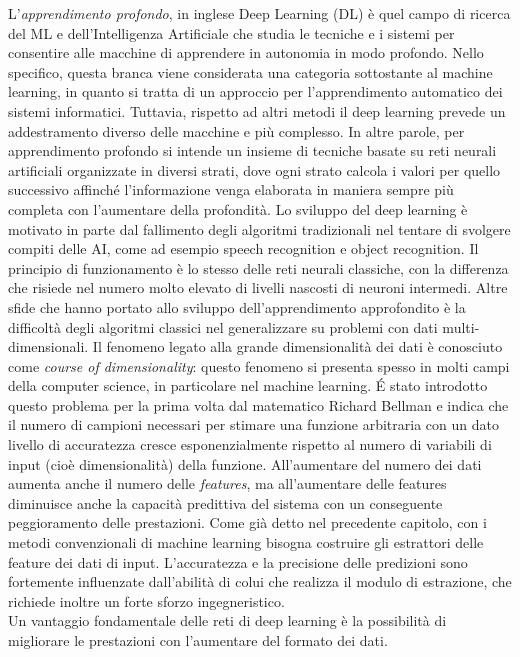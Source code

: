 L'\emph{apprendimento profondo}, in inglese Deep Learning (DL) è quel campo di ricerca del ML 
e dell'Intelligenza Artificiale che studia le tecniche e i sistemi per consentire alle macchine 
di apprendere in autonomia in modo profondo. Nello specifico, questa branca viene considerata una
 categoria sottostante al machine learning, in quanto si tratta di un approccio per l’apprendimento
  automatico dei sistemi informatici. Tuttavia, rispetto ad altri metodi il deep learning prevede 
  un addestramento diverso delle macchine e più complesso. In altre parole, per apprendimento profondo
   si intende un insieme
   di tecniche basate su reti neurali artificiali organizzate in diversi strati, dove ogni strato calcola
    i valori per quello successivo affinché l'informazione venga elaborata in maniera sempre più completa
     con l’aumentare della profondità. Lo sviluppo del deep learning è motivato in parte dal fallimento
      degli algoritmi
      tradizionali nel tentare di svolgere compiti delle AI, come ad esempio speech recognition e object recognition. 
      Il principio di funzionamento è lo stesso delle reti neurali classiche, con la differenza
       che risiede nel numero molto elevato di livelli nascosti di neuroni intermedi.
       Altre sfide che hanno portato allo sviluppo dell’apprendimento approfondito è la difficoltà
       degli algoritmi classici nel generalizzare su problemi con dati multi-dimensionali.
       Il fenomeno legato alla grande dimensionalità dei dati è conosciuto come \emph{course of 
       dimensionality}: questo fenomeno si presenta spesso in molti campi della computer science,
        in particolare nel machine learning. É stato introdotto questo problema per la prima volta
         dal matematico Richard Bellman e indica che il numero di campioni necessari per
          stimare una funzione arbitraria con un dato livello di accuratezza
           cresce esponenzialmente rispetto al numero di variabili di input
            (cioè dimensionalità) della funzione.
       All’aumentare del numero dei dati aumenta anche il numero delle \emph{features}, ma
        all’aumentare delle features diminuisce anche la capacità predittiva del
       sistema con un conseguente peggioramento delle prestazioni.
       Come già detto nel precedente capitolo, con i metodi convenzionali di machine learning
       bisogna costruire gli estrattori delle feature dei dati di input. L’accuratezza e la precisione
       delle predizioni sono fortemente influenzate dall’abilità di colui che realizza il modulo di
       estrazione, che richiede inoltre un forte sforzo ingegneristico.\\
       Un vantaggio fondamentale delle reti di deep learning è la possibilità di migliorare le prestazioni 
       con l’aumentare del formato dei dati.

